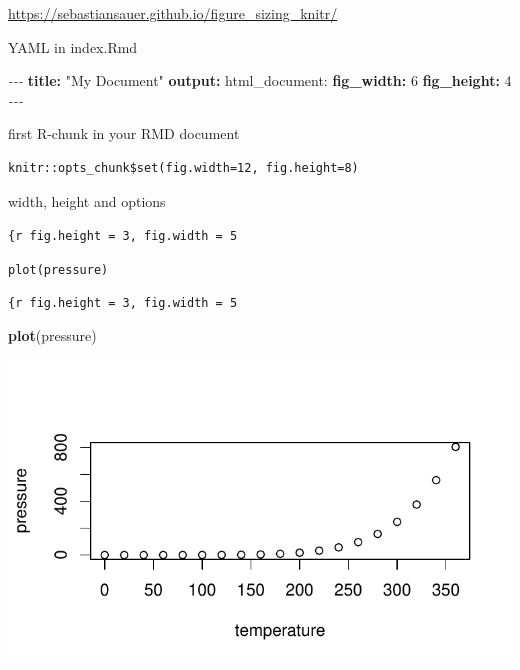 \documentclass[
]{book}
\newenvironment{Shaded}{\begin{snugshade}}{\end{snugshade}}
\newcommand{\AttributeTok}[1]{\textcolor[rgb]{0.13,0.29,0.53}{#1}}
\newcommand{\DecValTok}[1]{\textcolor[rgb]{0.00,0.00,0.81}{#1}}
\newcommand{\FunctionTok}[1]{\textcolor[rgb]{0.13,0.29,0.53}{\textbf{#1}}}
\newcommand{\KeywordTok}[1]{\textcolor[rgb]{0.13,0.29,0.53}{\textbf{#1}}}
\newcommand{\NormalTok}[1]{#1}
\newcommand{\PreprocessorTok}[1]{\textcolor[rgb]{0.56,0.35,0.01}{\textit{#1}}}
\newcommand{\StringTok}[1]{\textcolor[rgb]{0.31,0.60,0.02}{#1}}
\theoremstyle{definition}
\theoremstyle{definition}
\theoremstyle{definition}
\theoremstyle{definition}
\theoremstyle{remark}
\begin{document}
\url{https://sebastiansauer.github.io/figure_sizing_knitr/}

YAML in index.Rmd

\begin{Shaded}
\begin{Highlighting}[]
\PreprocessorTok{{-}{-}{-} }
\FunctionTok{title}\KeywordTok{:}\AttributeTok{ }\StringTok{"My Document"}\AttributeTok{ }
\FunctionTok{output}\KeywordTok{:}\AttributeTok{ html\_document: }
\FunctionTok{fig\_width}\KeywordTok{:}\AttributeTok{ }\DecValTok{6}\AttributeTok{ }
\FunctionTok{fig\_height}\KeywordTok{:}\AttributeTok{ }\DecValTok{4}\AttributeTok{ }
\PreprocessorTok{{-}{-}{-} }
\end{Highlighting}
\end{Shaded}

first R-chunk in your RMD document

\begin{verbatim}
knitr::opts_chunk$set(fig.width=12, fig.height=8) 
\end{verbatim}

width, height and options

\texttt{\textasciigrave{}\textasciigrave{}\textasciigrave{}\{r\ fig.height\ =\ 3,\ fig.width\ =\ 5}

\texttt{plot(pressure)}

\texttt{\textasciigrave{}\textasciigrave{}\textasciigrave{}}

\texttt{\{r\ fig.height\ =\ 3,\ fig.width\ =\ 5}

\begin{Shaded}
\begin{Highlighting}[]
\FunctionTok{plot}\NormalTok{(pressure)}
\end{Highlighting}
\end{Shaded}

\includegraphics{202401280001-test_files/figure-latex/unnamed-chunk-7-1.pdf}
\end{document}
